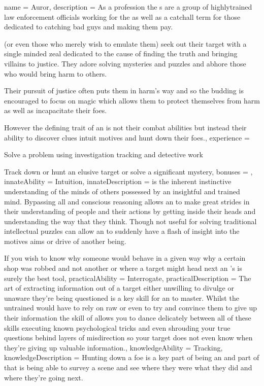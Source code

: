 \archetype
{
	name = Auror,
	description = As a profession\comma{} the \auror{}s are a group of highly\minus{}trained law enforcement officials working for the \comma{} as well as a catchall term for those dedicated to catching bad guys and making them pay.

 (or even those who merely wish to emulate them) seek out their target with a single minded zeal\comma{} dedicated to the cause of finding the truth and bringing villains to justice. They adore solving mysteries and puzzles\comma{} and abhore those who would bring harm to others. 

Their pursuit of justice often puts them in harm's way\comma{} and so the budding \auror{} is encouraged to focus on magic which allows them to protect themselves from harm\comma{} as well as incapacitate their foes. 

However\comma{} the defining trait of an \auror{} is not their combat abilities but instead their ability to discover clues\comma{} intuit motives and hunt down their foes.,
	experience = \item Solve a problem using investigation\comma{} tracking and detective work
\item Track down or hunt an elusive target or solve a significant mystery,
	bonuses = 
,
	innateAbility = Intuition,
	innateDescription = \imp{\innateAbility} is the inherent\comma{} instinctive understanding of the minds of others possessed by an insightful and trained mind. Bypassing all  and conscious reasoning\comma{}  allows an \name{} to make great strides in their understanding of people and their actions by getting inside their heads and understanding the way that they think. Though not useful for solving traditional intellectual puzzles\comma{} \imp{\innateAbility} can allow an \bname{} to suddenly have a flash of insight into the motives\comma{} aims or drive of another being. 

If you wish to know why someone would behave in a given way\comma{} why a certain shop was robbed and not another\comma{} or where a target might head next \minus{} an \name{}'s \imp{\innateAbility} is surely the best tool,
	practicalAbility = Interrogate,
	practicalDescription = The art of extracting information out of a target\comma{} either unwilling to divulge or unaware they're being questioned\comma{} is a key skill for an \bname{} to master.   Whilst the untrained would have to rely on raw \comma{} \comma{}  or even  to try and convince them to give up their information\comma{} the skill of  allows you to dance delicately between all of these skills\comma{} executing known psychological tricks and even shrouding your true questions behind layers of misdirection so your target does not even know when they're giving up valuable information.,
	knowledgeAbility = Tracking,
	knowledgeDescription = Hunting down a foe is a key part of being an \bname{}\comma{} and part of that is being able to survey a scene and see where they were\comma{} what they did\comma{} and where they're going next.

}
